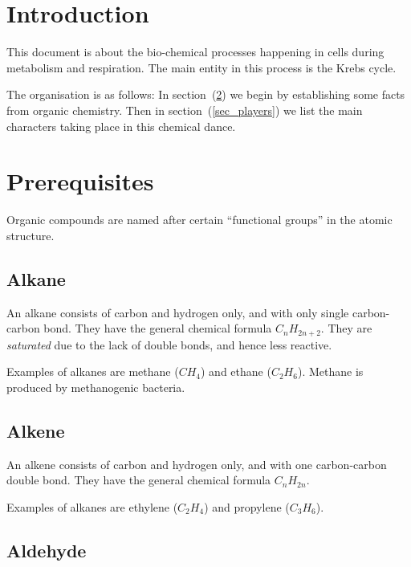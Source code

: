 \documentclass{article}
\begin{document}

\section{Introduction}

This document is about the bio-chemical processes happening in cells during metabolism and
respiration. The main entity in this process is the Krebs cycle.

The organisation is as follows: In section~(\ref{sec_prerequisites}) we begin by
establishing some facts from organic chemistry. Then in section~(\ref{sec_players})
we list the main characters taking place in this chemical dance.


\section{Prerequisites}\label{sec_prerequisites}

Organic compounds are named after certain ``functional groups'' in the atomic structure.

\subsection{Alkane}

An alkane consists of carbon and hydrogen only, and with only single carbon-carbon bond.
They have the general chemical formula $C_{n}H_{2n+2}$. They are {\em saturated\/}
due to the lack of double bonds, and hence less reactive.

Examples of alkanes are methane ($CH_4$) and ethane ($C_2H_6$).  Methane is produced by
methanogenic bacteria.

\subsection{Alkene}

An alkene consists of carbon and hydrogen only, and with one carbon-carbon double bond.
They have the general chemical formula $C_{n}H_{2n}$.

Examples of alkanes are ethylene ($C_2H_4$) and propylene ($C_3H_6$).

\subsection{Aldehyde}
\end{document}
